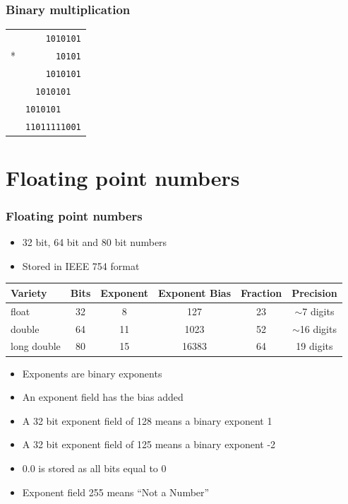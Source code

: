 \documentclass{beamer}
\begin{document}
\begin{frame}
\frametitle{Binary multiplication}
\begin{center}
\begin{tabular}{cr}
       & {\tt 1010101} \\
    *  & {\tt 10101} \\
\hline
       & {\tt 1010101} \\
       & {\tt 1010101\ \ } \\
       & {\tt 1010101\ \ \ \ } \\
\hline
       & {\tt 11011111001}
\end{tabular}
\end{center}
\end{frame}

\section{Floating point numbers}

\begin{frame}
    \frametitle{Floating point numbers}
    \begin{itemize}
        \item 32 bit, 64 bit and 80 bit numbers
        \item Stored in IEEE 754 format
    \end{itemize}

    \begin{center}
        \begin{tabular}{|l|c|c|c|c|c|}
        \hline
        Variety & Bits & Exponent & Exponent Bias & Fraction & Precision \\
        \hline
        float   &  32  & 8        &   127         & 23       & $\sim$7 digits \\
        \hline
        double  &  64  & 11       &  1023         & 52       & $\sim$16 digits \\
        \hline
        long double & 80 & 15     & 16383         & 64       & 19 digits \\
        \hline
        \end{tabular}
    \end{center}    
    \begin{itemize}
        \item Exponents are binary exponents
        \item An exponent field has the bias added
        \item A 32 bit exponent field of 128 means a binary exponent 1
        \item A 32 bit exponent field of 125 means a binary exponent -2
        \item 0.0 is stored as all bits equal to 0
        \item Exponent field 255 means ``Not a Number''
    \end{itemize}
\end{frame}
\end{document}
